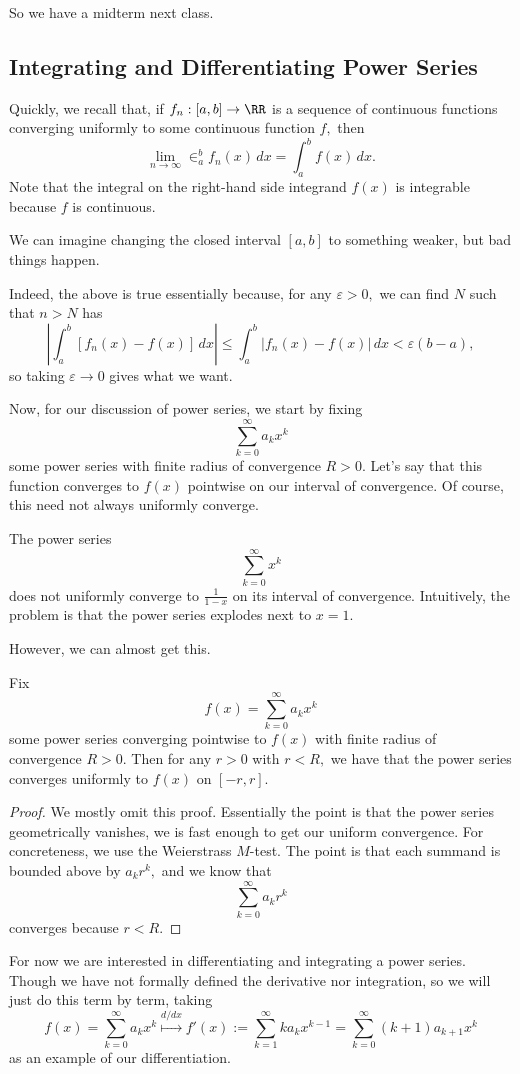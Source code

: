 \documentclass[../notes.tex]{subfiles}
\begin{document}
















So we have a midterm next class.

\subsection{Integrating and Differentiating Power Series}
Quickly, we recall that, if $f_n:[a,b]\to\RR$ is a sequence of continuous functions converging uniformly to some continuous function $f,$ then
\[\lim_{n\to\infty}\in_a^bf_n(x)\,dx=\int_a^bf(x)\,dx.\]
Note that the integral on the right-hand side integrand $f(x)$ is integrable because $f$ is continuous.
\begin{remark}
	We can imagine changing the closed interval $[a,b]$ to something weaker, but bad things happen.
\end{remark}
Indeed, the above is true essentially because, for any $\varepsilon>0,$ we can find $N$ such that $n>N$ has
\[\left|\int_a^b[f_n(x)-f(x)]\,dx\right|\le\int_a^b|f_n(x)-f(x)|\,dx<\varepsilon(b-a),\]
so taking $\varepsilon\to0$ gives what we want.

Now, for our discussion of power series, we start by fixing
\[\sum_{k=0}^\infty a_kx^k\]
some power series with finite radius of convergence $R>0.$ Let's say that this function converges to $f(x)$ pointwise on our interval of convergence. Of course, this need not always uniformly converge.
\begin{example}
	The power series
	\[\sum_{k=0}^\infty x^k\]
	does not uniformly converge to $\frac1{1-x}$ on its interval of convergence. Intuitively, the problem is that the power series explodes next to $x=1.$
\end{example}
However, we can almost get this.
\begin{proposition}
	Fix
	\[f(x)=\sum_{k=0}^\infty a_kx^k\]
	some power series converging pointwise to $f(x)$ with finite radius of convergence $R>0.$ Then for any $r>0$ with $r<R,$ we have that the power series converges uniformly to $f(x)$ on $[-r,r].$
\end{proposition}
\begin{proof}
	We mostly omit this proof. Essentially the point is that the power series geometrically vanishes, we is fast enough to get our uniform convergence. For concreteness, we use the Weierstrass $M$-test. The point is that each summand is bounded above by $a_kr^k,$ and we know that
	\[\sum_{k=0}^\infty a_kr^k\]
	converges because $r<R.$
\end{proof}
For now we are interested in differentiating and integrating a power series. Though we have not formally defined the derivative nor integration, so we will just do this term by term, taking
\[f(x)=\sum_{k=0}^\infty a_kx^k\stackrel{d/dx}\longmapsto f'(x):=\sum_{k=1}^\infty ka_kx^{k-1}=\sum_{k=0}^\infty(k+1)a_{k+1}x^k\]
as an example of our differentiation.
\end{document}

